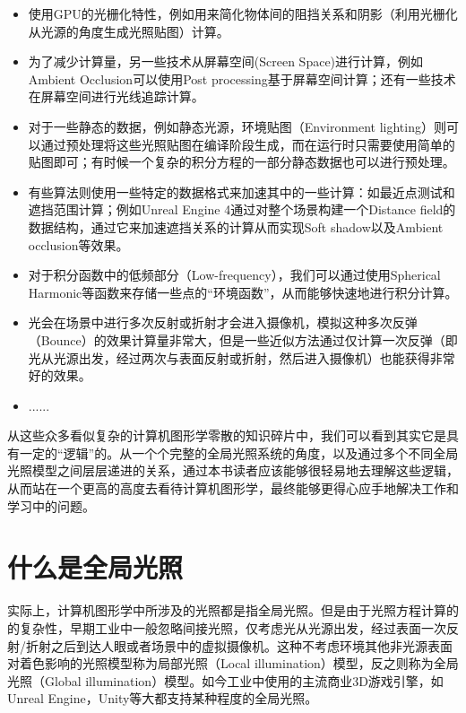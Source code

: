 \begin{itemize}
	\item 使用GPU的光栅化特性，例如用来简化物体间的阻挡关系和阴影（利用光栅化从光源的角度生成光照贴图）计算。
	\item 为了减少计算量，另一些技术从屏幕空间(Screen Space)进行计算，例如Ambient Occlusion可以使用Post processing基于屏幕空间计算；还有一些技术在屏幕空间进行光线追踪计算。
	\item 对于一些静态的数据，例如静态光源，环境贴图（Environment lighting）则可以通过预处理将这些光照贴图在编译阶段生成，而在运行时只需要使用简单的贴图即可；有时候一个复杂的积分方程的一部分静态数据也可以进行预处理。 
	\item 有些算法则使用一些特定的数据格式来加速其中的一些计算：如最近点测试和遮挡范围计算；例如Unreal Engine 4通过对整个场景构建一个Distance field的数据结构，通过它来加速遮挡关系的计算从而实现Soft shadow以及Ambient occlusion等效果。
	\item 对于积分函数中的低频部分（Low-frequency），我们可以通过使用Spherical Harmonic等函数来存储一些点的“环境函数”，从而能够快速地进行积分计算。
	\item 光会在场景中进行多次反射或折射才会进入摄像机，模拟这种多次反弹（Bounce）的效果计算量非常大，但是一些近似方法通过仅计算一次反弹（即光从光源出发，经过两次与表面反射或折射，然后进入摄像机）也能获得非常好的效果。
	\item ......
\end{itemize}

从这些众多看似复杂的计算机图形学零散的知识碎片中，我们可以看到其实它是具有一定的“逻辑”的。从一个个完整的全局光照系统的角度，以及通过多个不同全局光照模型之间层层递进的关系，通过本书读者应该能够很轻易地去理解这些逻辑，从而站在一个更高的高度去看待计算机图形学，最终能够更得心应手地解决工作和学习中的问题。




\section{什么是全局光照}
实际上，计算机图形学中所涉及的光照都是指全局光照。但是由于光照方程计算的的复杂性，早期工业中一般忽略间接光照，仅考虑光从光源出发，经过表面一次反射/折射之后到达人眼或者场景中的虚拟摄像机。这种不考虑环境其他非光源表面对着色影响的光照模型称为局部光照（Local illumination）模型，反之则称为全局光照（Global illumination）模型。如今工业中使用的主流商业3D游戏引擎，如Unreal Engine，Unity等大都支持某种程度的全局光照。


